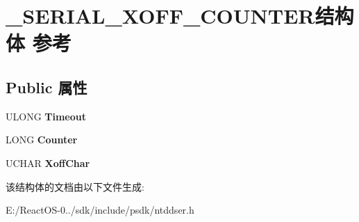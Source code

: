 \hypertarget{struct___s_e_r_i_a_l___x_o_f_f___c_o_u_n_t_e_r}{}\section{\+\_\+\+S\+E\+R\+I\+A\+L\+\_\+\+X\+O\+F\+F\+\_\+\+C\+O\+U\+N\+T\+E\+R结构体 参考}
\label{struct___s_e_r_i_a_l___x_o_f_f___c_o_u_n_t_e_r}
\subsection*{Public 属性}
\begin{DoxyCompactItemize}
\item 
\mbox{\label{struct___s_e_r_i_a_l___x_o_f_f___c_o_u_n_t_e_r_a87da5241c03d429909835ea38660fa24}} 
U\+L\+O\+NG {\bfseries Timeout}
\item 
\mbox{\label{struct___s_e_r_i_a_l___x_o_f_f___c_o_u_n_t_e_r_af3b6f939ea675f283e100d856147e7eb}} 
L\+O\+NG {\bfseries Counter}
\item 
\mbox{\label{struct___s_e_r_i_a_l___x_o_f_f___c_o_u_n_t_e_r_a529679669b4e9246d0e3003d58c27621}} 
U\+C\+H\+AR {\bfseries Xoff\+Char}
\end{DoxyCompactItemize}


该结构体的文档由以下文件生成\+:\begin{DoxyCompactItemize}
\item 
E\+:/\+React\+O\+S-\/0../sdk/include/psdk/ntddser.\+h\end{DoxyCompactItemize}
